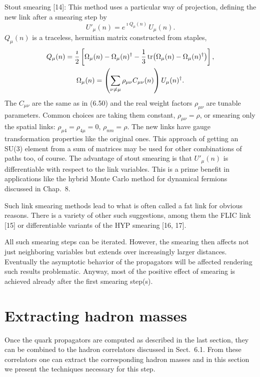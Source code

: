 Stout smearing [14]: This method uses a particular way of projection, defining
the new link after a smearing step by
\begin{equation}
  U'_\mu(n) = e^{\imath Q_\mu(n)}\, U_\mu(n) .
\end{equation}
$Q_\mu(n)$ is a traceless, hermitian matrix constructed from staples,
\begin{equation}
  \begin{gathered}
    Q_\mu(n) = \frac{\imath}{2}\left[ \Omega_\mu(n) - \Omega_\mu(n)^\dagger
      - \frac{1}{3}\operatorname{tr}\!\left( \Omega_\mu(n) - \Omega_\mu(n)^\dagger \right)
      \right], \\
    \Omega_\mu(n) = \left( \sum_{\nu\neq\mu} \rho_{\mu\nu} C_{\mu\nu}(n)
      \right) U_\mu(n)^\dagger .
  \end{gathered}
\end{equation}
The $C_{\mu\nu}$ are the same as in (6.50) and the real weight factors
$\rho_{\mu\nu}$ are tunable parameters. Common choices are taking them
constant, $\rho_{\mu\nu} = \rho$, or smearing only the spatial links:
$\rho_{\mu 4} = \rho_{4\mu} = 0$, $\rho_{nm} = \rho$. The new links have gauge
transformation properties like the original ones. This approach of getting an
SU(3) element from a sum of matrices may be used for other combinations of
paths too, of course. The advantage of stout smearing is that $U'_\mu(n)$ is
differentiable with respect to the link variables. This is a prime benefit in
applications like the hybrid Monte Carlo method for dynamical fermions
discussed in Chap.~8.

Such link smearing methods lead to what is often called a fat link for obvious
reasons. There is a variety of other such suggestions, among them the FLIC link
[15] or differentiable variants of the HYP smearing [16, 17].

All such smearing steps can be iterated. However, the smearing then affects not
just neighboring variables but extends over increasingly larger distances.
Eventually the asymptotic behavior of the propagators will be affected
rendering such results problematic. Anyway, most of the positive effect of
smearing is achieved already after the first smearing step(s).

\section{Extracting hadron masses}

Once the quark propagators are computed as described in the last section, they
can be combined to the hadron correlators discussed in Sect.~6.1. From these
correlators one can extract the corresponding hadron masses and in this section
we present the techniques necessary for this step.

